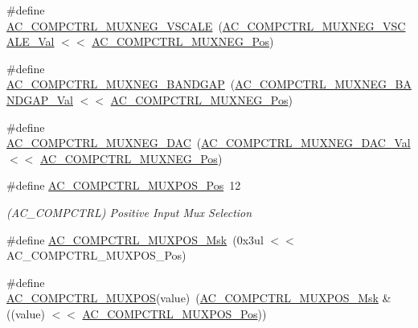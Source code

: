 \begin{DoxyCompactItemize}
\item 
\#define \mbox{\hyperlink{group___s_a_m_d21___a_c_gabc3e5eaec135213f9261e0bcefeff5e1}{A\+C\+\_\+\+C\+O\+M\+P\+C\+T\+R\+L\+\_\+\+M\+U\+X\+N\+E\+G\+\_\+\+V\+S\+C\+A\+LE}}~(\mbox{\hyperlink{group___s_a_m_d21___a_c_ga6c73eec576197476fa0e9ed08bfe24a2}{A\+C\+\_\+\+C\+O\+M\+P\+C\+T\+R\+L\+\_\+\+M\+U\+X\+N\+E\+G\+\_\+\+V\+S\+C\+A\+L\+E\+\_\+\+Val}} $<$$<$ \mbox{\hyperlink{group___s_a_m_d21___a_c_gae66ccdb1fdce71c5b35d4acf2dcd5234}{A\+C\+\_\+\+C\+O\+M\+P\+C\+T\+R\+L\+\_\+\+M\+U\+X\+N\+E\+G\+\_\+\+Pos}})
\item 
\#define \mbox{\hyperlink{group___s_a_m_d21___a_c_gaf52d9d91e15ed495a18b0ee1f6daaaa2}{A\+C\+\_\+\+C\+O\+M\+P\+C\+T\+R\+L\+\_\+\+M\+U\+X\+N\+E\+G\+\_\+\+B\+A\+N\+D\+G\+AP}}~(\mbox{\hyperlink{group___s_a_m_d21___a_c_gacef3eff54dde36e480ae03d0812de305}{A\+C\+\_\+\+C\+O\+M\+P\+C\+T\+R\+L\+\_\+\+M\+U\+X\+N\+E\+G\+\_\+\+B\+A\+N\+D\+G\+A\+P\+\_\+\+Val}} $<$$<$ \mbox{\hyperlink{group___s_a_m_d21___a_c_gae66ccdb1fdce71c5b35d4acf2dcd5234}{A\+C\+\_\+\+C\+O\+M\+P\+C\+T\+R\+L\+\_\+\+M\+U\+X\+N\+E\+G\+\_\+\+Pos}})
\item 
\#define \mbox{\hyperlink{group___s_a_m_d21___a_c_ga252b852a7c6823da0a12602882953df3}{A\+C\+\_\+\+C\+O\+M\+P\+C\+T\+R\+L\+\_\+\+M\+U\+X\+N\+E\+G\+\_\+\+D\+AC}}~(\mbox{\hyperlink{group___s_a_m_d21___a_c_ga8e6a3e15110f0de0d04e4f3d91025027}{A\+C\+\_\+\+C\+O\+M\+P\+C\+T\+R\+L\+\_\+\+M\+U\+X\+N\+E\+G\+\_\+\+D\+A\+C\+\_\+\+Val}}    $<$$<$ \mbox{\hyperlink{group___s_a_m_d21___a_c_gae66ccdb1fdce71c5b35d4acf2dcd5234}{A\+C\+\_\+\+C\+O\+M\+P\+C\+T\+R\+L\+\_\+\+M\+U\+X\+N\+E\+G\+\_\+\+Pos}})
\item 
\#define \mbox{\hyperlink{group___s_a_m_d21___a_c_gad4bb8c36791a0ea8139ae435b00e4365}{A\+C\+\_\+\+C\+O\+M\+P\+C\+T\+R\+L\+\_\+\+M\+U\+X\+P\+O\+S\+\_\+\+Pos}}~12
\begin{DoxyCompactList}\small\item\em (A\+C\+\_\+\+C\+O\+M\+P\+C\+T\+RL) Positive Input Mux Selection \end{DoxyCompactList}\item 
\#define \mbox{\hyperlink{group___s_a_m_d21___a_c_ga563ff2195d1f198f1329d7f36abb7b4e}{A\+C\+\_\+\+C\+O\+M\+P\+C\+T\+R\+L\+\_\+\+M\+U\+X\+P\+O\+S\+\_\+\+Msk}}~(0x3ul $<$$<$ A\+C\+\_\+\+C\+O\+M\+P\+C\+T\+R\+L\+\_\+\+M\+U\+X\+P\+O\+S\+\_\+\+Pos)
\item 
\#define \mbox{\hyperlink{group___s_a_m_d21___a_c_gad1711edb5cdd3e0d22a552aef0bb9f82}{A\+C\+\_\+\+C\+O\+M\+P\+C\+T\+R\+L\+\_\+\+M\+U\+X\+P\+OS}}(value)~(\mbox{\hyperlink{group___s_a_m_d21___a_c_ga563ff2195d1f198f1329d7f36abb7b4e}{A\+C\+\_\+\+C\+O\+M\+P\+C\+T\+R\+L\+\_\+\+M\+U\+X\+P\+O\+S\+\_\+\+Msk}} \& ((value) $<$$<$ \mbox{\hyperlink{group___s_a_m_d21___a_c_gad4bb8c36791a0ea8139ae435b00e4365}{A\+C\+\_\+\+C\+O\+M\+P\+C\+T\+R\+L\+\_\+\+M\+U\+X\+P\+O\+S\+\_\+\+Pos}}))
$$
\end{DoxyCompactItemize}
